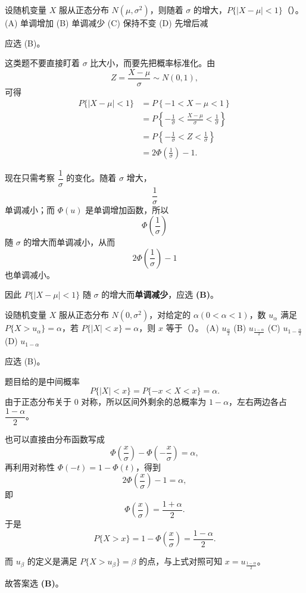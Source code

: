 ﻿\documentclass[lang=cn,11pt]{elegantbook}
\begin{document}
\begin{exercise}\label{exer:2-17}
设随机变量 $X$ 服从正态分布 $N(\mu,\sigma^2)$，则随着 $\sigma$ 的增大，$P\{|X-\mu|<1\}$（\quad）。\\
(A) 单调增加 \quad (B) 单调减少 \quad (C) 保持不变 \quad (D) 先增后减
\end{exercise}
\begin{solution}
应选 (B)。

这类题不要直接盯着 \(\sigma\) 比大小，而要先把概率标准化。由
\[
Z=\frac{X-\mu}{\sigma}\sim N(0,1),
\]
可得
\[
\begin{aligned}
P\{|X-\mu|<1\}
&=P\left\{-1<X-\mu<1\right\}\\
&=P\left\{-\frac{1}{\sigma}<\frac{X-\mu}{\sigma}<\frac{1}{\sigma}\right\}\\
&=P\left\{-\frac{1}{\sigma}<Z<\frac{1}{\sigma}\right\}\\
&=2\Phi\left(\frac{1}{\sigma}\right)-1.
\end{aligned}
\]

现在只需考察 \(\dfrac{1}{\sigma}\) 的变化。随着 \(\sigma\) 增大，
\[
\frac{1}{\sigma}
\]
单调减小；而 \(\Phi(u)\) 是单调增加函数，所以
\[
\Phi\left(\frac{1}{\sigma}\right)
\]
随 \(\sigma\) 的增大而单调减小，从而
\[
2\Phi\left(\frac{1}{\sigma}\right)-1
\]
也单调减小。

因此 \(P\{|X-\mu|<1\}\) 随 \(\sigma\) 的增大而\textbf{单调减少}，应选 \textbf{(B)}。
\end{solution}

\begin{exercise}\label{exer:2-12}
设随机变量 $X$ 服从正态分布 $N(0,\sigma^2)$，对给定的 $\alpha(0<\alpha<1)$，数 $u_\alpha$ 满足 $P\{X>u_\alpha\} = \alpha$，若 $P\{|X|<x\} = \alpha$，则 $x$ 等于（\quad）。
(A) $u_{\frac{\alpha}{2}}$ \quad (B) $u_{\frac{1-\alpha}{2}}$ \quad (C) $u_{1-\frac{\alpha}{2}}$ \quad (D) $u_{1-\alpha}$
\end{exercise}

\begin{solution}
应选 (B)。

题目给的是中间概率
\[
P\{|X|<x\}=P\{-x<X<x\}=\alpha.
\]
由于正态分布关于 0 对称，所以区间外剩余的总概率为 \(1-\alpha\)，左右两边各占 \(\dfrac{1-\alpha}{2}\)。

也可以直接由分布函数写成
\[
\Phi\left(\frac{x}{\sigma}\right)-\Phi\left(-\frac{x}{\sigma}\right)=\alpha,
\]
再利用对称性 \(\Phi(-t)=1-\Phi(t)\)，得到
\[
2\Phi\left(\frac{x}{\sigma}\right)-1=\alpha,
\]
即
\[
\Phi\left(\frac{x}{\sigma}\right)=\frac{1+\alpha}{2}.
\]
于是
\[
P\{X>x\}=1-\Phi\left(\frac{x}{\sigma}\right)=\frac{1-\alpha}{2}.
\]

而 \(u_\beta\) 的定义是满足 \(P\{X>u_\beta\}=\beta\) 的点，与上式对照可知 \(x=u_{\frac{1-\alpha}{2}}\)。

故答案选 \textbf{(B)}。
\end{solution}
\end{document}

